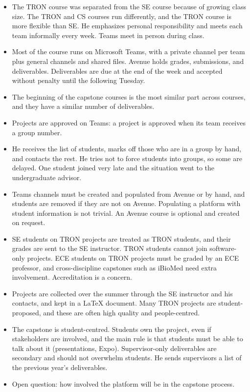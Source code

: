 \documentclass{article}
\begin{document}
    \begin{itemize}
        \item The TRON course was separated from the SE course because of growing class size. The TRON and CS
        courses run differently, and the TRON course is more flexible than SE. He emphasizes personal
        responsibility and meets each team informally every week. Teams meet in person during class.
        \item Most of the course runs on Microsoft Teams, with a private channel per team plus general channels
        and shared files. Avenue holds grades, submissions, and deliverables. Deliverables are due at the end
        of the week and accepted without penalty until the following Tuesday.
        \item The beginning of the capstone courses is the most similar part across courses, and they have a similar
        number of deliverables.
        \item Projects are approved on Teams: a project is approved when its team receives a group number.
        \item He receives the list of students, marks off those who are in a group by hand, and contacts the rest.
        He tries not to force students into groups, so some are delayed. One student joined very late and the
        situation went to the undergraduate advisor.
        \item Teams channels must be created and populated from Avenue or by hand, and students are removed if they
        are not on Avenue. Populating a platform with student information is not trivial. An Avenue course is
        optional and created on request.
        \item SE students on TRON projects are treated as TRON students, and their grades are sent to the SE
        instructor. TRON students cannot join software-only projects. ECE students on TRON projects must be graded
        by an ECE professor, and cross-discipline capstones such as iBioMed need extra involvement. Accreditation
        is a concern.
        \item Projects are collected over the summer through the SE instructor and his contacts, and kept in a
        LaTeX document. Many TRON projects are student-proposed, and these are often high quality and
        people-centred.
        \item The capstone is student-centred. Students own the project, even if stakeholders are involved, and
        the main rule is that students must be able to talk about it (presentations, Expo). Supervisor-only
        deliverables are secondary and should not overwhelm students. He sends supervisors a list of the previous
        year's deliverables.
        \item Open question: how involved the platform will be in the capstone process.
    \end{itemize}
\end{document}
